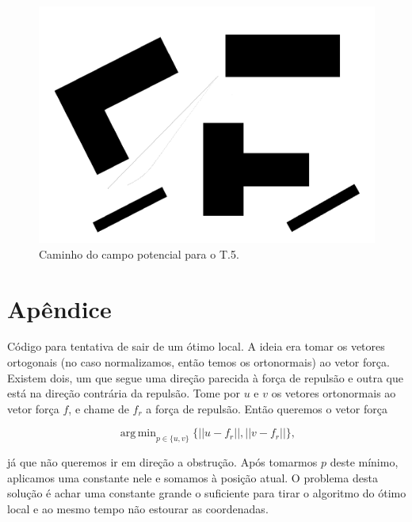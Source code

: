\documentclass[12pt]{article}
\DeclareMathOperator*{\argmin}{arg\,min}
\theoremstyle{plain}
\numberwithin{equation}{section}
\begin{document}
\begin{figure}[H]
  \centering\includegraphics[scale=0.4]{imgs/potential_field_4.png}
  \caption{Caminho do campo potencial para o T.5.}
\end{figure}

\section{Apêndice}

Código para tentativa de sair de um ótimo local. A ideia era tomar os vetores ortogonais (no caso
normalizamos, então temos os ortonormais) ao vetor força. Existem dois, um que segue uma direção
parecida à força de repulsão e outra que está na direção contrária da repulsão. Tome por $u$ e $v$
os vetores ortonormais ao vetor força $f$, e chame de $f_r$ a força de repulsão. Então queremos o
vetor força

\begin{equation*}
  \argmin_{p\in\{u,v\}}\{||u-f_r||, ||v-f_r||\},
\end{equation*}

já que não queremos ir em direção a obstrução. Após tomarmos $p$ deste mínimo, aplicamos uma
constante nele e somamos à posição atual.  O problema desta solução é achar uma constante grande o
suficiente para tirar o algoritmo do ótimo local e ao mesmo tempo não estourar as
coordenadas.\newpage
\end{document}
